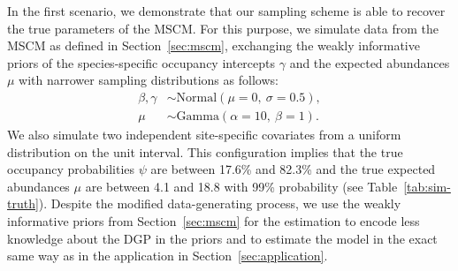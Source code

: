 \documentclass{article}
\begin{document}
In the first scenario, we demonstrate that our sampling scheme is able to recover the true parameters of the MSCM. For this purpose, we simulate data from the MSCM as defined in Section~\ref{sec:mscm}, exchanging the weakly informative priors of the species-specific occupancy intercepts $\gamma$ and the expected abundances $\mu$ with narrower sampling distributions as follows:
\begin{align*}
\beta, \gamma &\sim \text{Normal}(\mu = 0,\ \sigma = 0.5), \\
          \mu &\sim \text{Gamma}(\alpha = 10,\ \beta = 1).
\end{align*}
We also simulate two independent site-specific covariates from a uniform distribution on the unit interval. This configuration implies that the true occupancy probabilities $\psi$ are between 17.6\% and 82.3\% and the true expected abundances $\mu$ are between 4.1 and 18.8 with 99\% probability (see Table~\ref{tab:sim-truth}). Despite the modified data-generating process, we use the weakly informative priors from Section~\ref{sec:mscm} for the estimation to encode less knowledge about the DGP in the priors and to estimate the model in the exact same way as in the application in Section~\ref{sec:application}.
\end{document}
